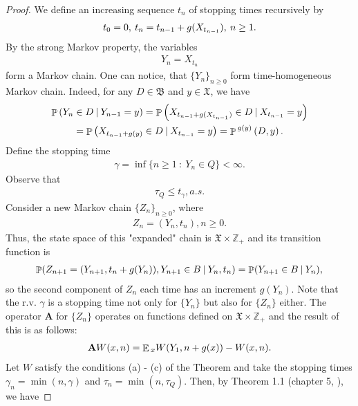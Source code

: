 \documentclass[10pt, reqno]{amsart}
\theoremstyle{definition}
\newcommand{\aasVar}{Q} %
\newcommand{\asaVar}{\mathfrak{B}} %
\newcommand{\astVar}{\tau} %
\newcommand{\wtfVar}{W} %
\newcommand{\atoVar}{\mathbf{A}} %
\newcommand{\assVar}{\mathfrak{X}} %
\newcommand{\integers}{\mathbb{Z}} %
\DeclareMathOperator*{\E}{\mathbb{E}}
\DeclareMathOperator*{\Pb}{\mathbb{P}}
\begin{document}
	\begin{proof}
		We define an increasing sequence $t_{n}$ of stopping times recursively by
		\begin{gather*}
		t_{0} = 0, \: t_{n} = t_{n-1} + g(X_{t_{n-1}}), \: n \geq 1.
		\end{gather*}
		By the strong Markov property, the variables
		\begin{gather*}
		Y_{n} = X_{t_{n}}
		\end{gather*}
		form a Markov chain. One can notice, that $\{Y_{n}\}_{n \geq 0}$ form time-homogeneous Markov chain. Indeed, for any $D \in \asaVar$ and $y \in \assVar$, we have
		\begin{gather*}
		\Pb\left(Y_{n} \in D \: | \: Y_{n-1} = y\right) = \Pb\left(X_{t_{n-1} + \gffVar(X_{t_{n-1}})} \in D \: | \: X_{t_{n-1}} = y\right) \\ = \Pb\left(X_{t_{n-1} + \gffVar(y)} \in D \: | \: X_{t_{n-1}} = y\right) = \Pb{}^{\gffVar(y)}\left(D, y\right).
		\end{gather*}
		Define the stopping time
		\begin{gather*}
		\gamma = \inf\{n \geq 1 \: : \: Y_{n} \in \aasVar\} < \infty.
		\end{gather*}
		Observe that
		\begin{gather*}
		\astVar_{\aasVar} \leq t_{\gamma}, a.s.
		\end{gather*}
		Consider a new Markov chain $\{Z_{n}\}_{n \geq 0}$, where
		\begin{gather*}
		Z_{n} = (Y_{n}, t_{n}), n \geq 0.
		\end{gather*}
		Thus, the state space of this "expanded"$ $ chain is $\assVar \times \integers_{+}$ and its transition function is
		\begin{gather*}
		\Pb(Z_{n+1} = (Y_{n+1}, t_{n}+\gffVar(Y_{n})), Y_{n+1} \in B \: | \: Y_{n}, t_{n}) = \Pb(Y_{n+1} \in B \: | \: Y_{n}),
		\end{gather*}
		so the second component of $Z_{n}$ each time has an increment $g(Y_{n})$. Note that the r.v. $\gamma$ is a stopping time not only for $\{Y_{n}\}$ but also for $\{Z_{n}\}$ either. The operator $\atoVar$ for $\{Z_{n}\}$ operates on functions defined on $\assVar \times \integers_{+}$ and the result of this is as follows:
		\begin{gather*}
		\atoVar\wtfVar(x, n) = \E{}_{x}\wtfVar(Y_{1}, n+\gffVar(x)) - \wtfVar(x, n).
		\end{gather*}
		Let $\wtfVar$ satisfy the conditions (a) - (c) of the Theorem and take the stopping times $\gamma_{n} = \min(n, \gamma)$ and $\astVar_{n} = \min(n, \astVar_{\aasVar})$. Then, by Theorem 1.1 (chapter 5, \cite{Kalashnikov}), we have

\end{proof}
\end{document}
